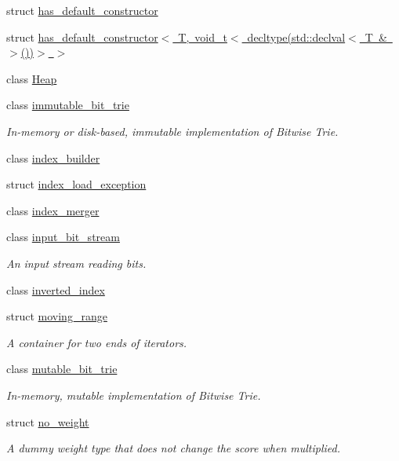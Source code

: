 \begin{DoxyCompactItemize}
struct \mbox{\hyperlink{structirk_1_1has__default__constructor}{has\+\_\+default\+\_\+constructor}}
\item 
struct \mbox{\hyperlink{structirk_1_1has__default__constructor_3_01T_00_01void__t_3_01decltype_07std_1_1declval_3_01T_01_6_01_4_07_08_08_4_01_4}{has\+\_\+default\+\_\+constructor$<$ T, void\+\_\+t$<$ decltype(std\+::declval$<$ T \& $>$())$>$ $>$}}
\item 
class \mbox{\hyperlink{classirk_1_1Heap}{Heap}}
\item 
class \mbox{\hyperlink{classirk_1_1immutable__bit__trie}{immutable\+\_\+bit\+\_\+trie}}
\begin{DoxyCompactList}\small\item\em In-\/memory or disk-\/based, immutable implementation of Bitwise Trie. \end{DoxyCompactList}\item 
class \mbox{\hyperlink{classirk_1_1index__builder}{index\+\_\+builder}}
\item 
struct \mbox{\hyperlink{structirk_1_1index__load__exception}{index\+\_\+load\+\_\+exception}}
\item 
class \mbox{\hyperlink{classirk_1_1index__merger}{index\+\_\+merger}}
\item 
class \mbox{\hyperlink{classirk_1_1input__bit__stream}{input\+\_\+bit\+\_\+stream}}
\begin{DoxyCompactList}\small\item\em An input stream reading bits. \end{DoxyCompactList}\item 
class \mbox{\hyperlink{classirk_1_1inverted__index}{inverted\+\_\+index}}
\item 
struct \mbox{\hyperlink{structirk_1_1moving__range}{moving\+\_\+range}}
\begin{DoxyCompactList}\small\item\em A container for two ends of iterators. \end{DoxyCompactList}\item 
class \mbox{\hyperlink{classirk_1_1mutable__bit__trie}{mutable\+\_\+bit\+\_\+trie}}
\begin{DoxyCompactList}\small\item\em In-\/memory, mutable implementation of Bitwise Trie. \end{DoxyCompactList}\item 
struct \mbox{\hyperlink{structirk_1_1no__weight}{no\+\_\+weight}}
\begin{DoxyCompactList}\small\item\em A dummy weight type that does not change the score when multiplied. \end{DoxyCompactList}\item 

\end{DoxyCompactItemize}
